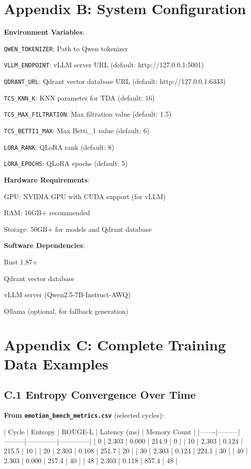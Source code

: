 \documentclass[11pt,a4paper]{article}
\begin{document}
\section{Appendix B: System Configuration}

\textbf{Environment Variables}:
\item \texttt{QWEN_TOKENIZER}: Path to Qwen tokenizer
\item \texttt{VLLM_ENDPOINT}: vLLM server URL (default: http://127.0.0.1:5001)
\item \texttt{QDRANT_URL}: Qdrant vector database URL (default: http://127.0.0.1:6333)
\item \texttt{TCS_KNN_K}: KNN parameter for TDA (default: 16)
\item \texttt{TCS_MAX_FILTRATION}: Max filtration value (default: 1.5)
\item \texttt{TCS_BETTI1_MAX}: Max Betti_1 value (default: 6)
\item \texttt{LORA_RANK}: QLoRA rank (default: 8)
\item \texttt{LORA_EPOCHS}: QLoRA epochs (default: 5)

\textbf{Hardware Requirements}:
\item GPU: NVIDIA GPU with CUDA support (for vLLM)
\item RAM: 16GB+ recommended
\item Storage: 50GB+ for models and Qdrant database

\textbf{Software Dependencies}:
\item Rust 1.87+
\item Qdrant vector database
\item vLLM server (Qwen2.5-7B-Instruct-AWQ)
\item Ollama (optional, for fallback generation)

\section{Appendix C: Complete Training Data Examples}

\subsection{C.1 Entropy Convergence Over Time}

\textbf{From \texttt{emotion_bench_metrics.csv}} (selected cycles):

| Cycle | Entropy | ROUGE-L | Latency (ms) | Memory Count |
|-------|---------|---------|--------------|--------------|
| 0 | 2.303 | 0.000 | 214.9 | 0 |
| 10 | 2.303 | 0.124 | 215.5 | 10 |
| 20 | 2.303 | 0.108 | 251.7 | 20 |
| 30 | 2.303 | 0.124 | 224.1 | 30 |
| 40 | 2.303 | 0.000 | 217.4 | 40 |
| 48 | 2.303 | 0.118 | 857.4 | 48 |
\end{document}
